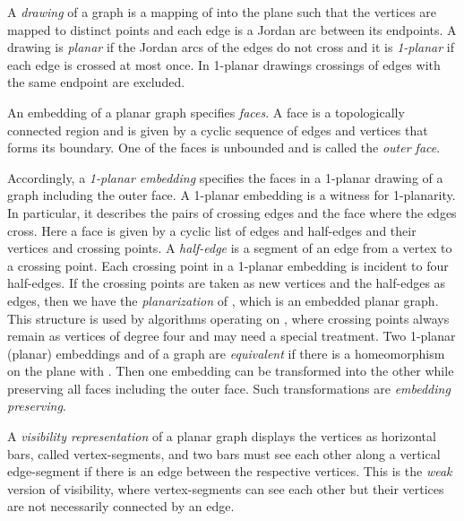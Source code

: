 \documentclass[runningheads]{llncs}
\begin{document}
A \emph{drawing} of a graph is a mapping of  into the plane such
that the vertices are mapped to distinct points and each edge is a
Jordan arc between its endpoints. A drawing is \textit{planar} if
the Jordan arcs of the edges do not cross and it is
\textit{1-planar} if each edge is crossed at most once. In 1-planar
drawings  crossings of edges with the same endpoint are excluded.


An embedding  of a planar graph  specifies
\emph{faces}. A face is a topologically connected region and is
given by a cyclic sequence of edges and vertices  that forms its
boundary. One of the faces is unbounded and is called the
\emph{outer face}.

Accordingly, a \emph{1-planar embedding}  specifies
the faces in a 1-planar drawing of a graph  including the outer
face. A 1-planar embedding is a witness for 1-planarity.  In
particular, it describes the pairs of crossing edges and the face
where the edges cross. Here a face is given by a cyclic list of
edges and half-edges and their vertices and crossing points. A
\emph{half-edge} is a segment of an edge from a vertex to a crossing
point. Each crossing point in a 1-planar embedding is incident to
four half-edges. If the crossing points are taken as new vertices
and the half-edges  as  edges, then we have the \emph{planarization}
of , which is an embedded planar graph. This
structure is used by algorithms operating on  ,
where crossing points always remain as vertices of degree four and
may need a special treatment. Two 1-planar (planar) embeddings
 and  of a graph are
\emph{equivalent} if there is a homeomorphism  on the plane with
. Then one embedding can be
transformed into the other while preserving all faces including the
outer face. Such transformations are \emph{embedding preserving}.


A  \emph{visibility representation} of a planar graph displays the
vertices as horizontal bars, called vertex-segments, and two bars
must see each other along a vertical edge-segment if there is an
edge between the respective vertices. This is the \emph{weak}
version of visibility, where vertex-segments can see each other but
their vertices are not necessarily connected by an edge.

\iffalse
 In the -visibility the edges are represented by
vertical edge-segments of thickness  and there is such a edge-segment if and only if there is an
edge. The strong version imposes an if and only if condition between
edges and visibility. For 2-connected graphs there is no essential
difference between weak and -visibility \cite{TT-vrpg-86},
since   every weak visibility representation can be transformed into
an embedding preserving -visibility representation with at
most twice the width of the drawing. \fi
\end{document}
